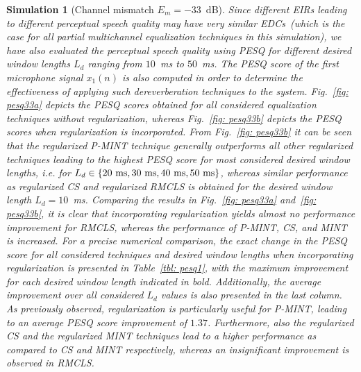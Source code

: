 \documentclass[draftcls,onecolumn,11pt]{IEEEtran}
\newtheorem{simulation}{Simulation}
\begin{document}
\begin{simulation}[Channel mismatch $E_m=-33$~dB]
Since different EIRs leading to different perceptual speech quality may have very similar EDCs~(which is the case for all partial multichannel equalization techniques in this simulation), we have also evaluated the perceptual speech quality using PESQ for different desired window lengths $L_d$ ranging from $10$~ms to $50$~ms.
The PESQ score of the first microphone signal $x_1(n)$ is also computed in order to determine the effectiveness of applying such dereverberation techniques to the system.
Fig.~\ref{fig: pesq33a} depicts the PESQ scores obtained for all considered equalization techniques without regularization, whereas Fig.~\ref{fig: pesq33b} depicts the PESQ scores when regularization is incorporated.
From Fig.~\ref{fig: pesq33b} it can be seen that the regularized P-MINT technique generally outperforms all other regularized techniques leading to the highest PESQ score for most considered desired window lengths, i.e. for $L_d \in \{20~{\rm ms}, 30~{\rm ms}, 40~{\rm ms}, 50~{\rm ms} \}$, whereas similar performance as regularized CS and regularized RMCLS is obtained for the desired window length $L_d = 10$~ms.
Comparing the results in Fig.~\ref{fig: pesq33a} and~\ref{fig: pesq33b}, it is clear that incorporating regularization yields almost no performance improvement for RMCLS, whereas the performance of P-MINT, CS, and MINT is increased.
For a precise numerical comparison, the exact change in the PESQ score for all considered techniques and desired window lengths when incorporating regularization is presented in Table~\ref{tbl: pesq1}, with the maximum improvement for each desired window length indicated in bold.
Additionally, the average improvement over all considered $L_d$ values is also presented in the last column.
As previously observed, regularization is particularly useful for P-MINT, leading to an average PESQ score improvement of $1.37$.
Furthermore, also the regularized CS and the regularized MINT techniques lead to a higher performance as compared to CS and MINT respectively, whereas an insignificant improvement is observed in RMCLS.
\end{simulation}
\end{document}

